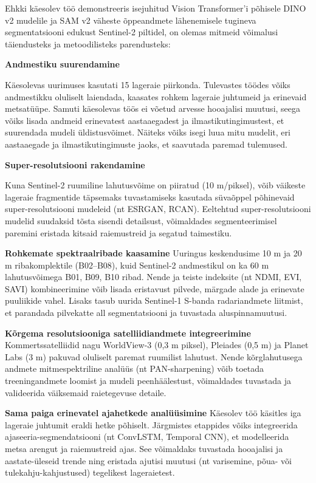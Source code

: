 Ehkki käesolev töö demonstreeris isejuhitud Vision Transformer'i põhisele DINO
v2 mudelile ja SAM v2 väheste õppeandmete lähenemisele tugineva segmentatsiooni
edukust Sentinel-2 piltidel, on olemas mitmeid võimalusi täiendusteks ja
metoodilisteks parendusteks:

\textbf{Andmestiku suurendamine}

Käesolevas uurimuses kasutati 15 lageraie piirkonda. Tulevastes töödes võiks
andmestikku oluliselt laiendada, kaasates rohkem lageraie juhtumeid ja
erinevaid metsatüüpe. Samuti käesolevas töös ei võetud arvesse hooajalisi
muutusi, seega võiks lisada andmeid erinevatest aastaaegadest ja ilmastikutingimustest,
et suurendada mudeli üldistusvõimet. Näiteks võiks isegi luua mitu mudelit, eri aastaaegade ja ilmastikutingimuste jaoks, et saavutada paremad tulemused.

\textbf{Super-resolutsiooni rakendamine} 

Kuna Sentinel-2 ruumiline lahutusvõime on
piiratud (10 m/piksel), võib väikeste lageraie fragmentide täpsemaks tuvastamiseks
kasutada süvaõppel põhinevaid super-resolutsiooni mudeleid (nt ESRGAN, RCAN).
Eeltehtud super-resolutsiooni mudelid suudaksid tõsta sisendi detailsust,
võimaldades segmenteerimisel paremini eristada kitsaid raiemustreid ja segatud
taimestiku.

\textbf{Rohkemate spektraalribade kaasamine} 
Uuringus keskendusime 10 m ja 20 m
riba­komplektile (B02--B08), kuid Sentinel-2 andmestikul on ka 60 m
lahutusvõimega B01, B09, B10 ribad. Nende ja teiste indeksite (nt NDMI, EVI,
SAVI) kombineerimine võib lisada eristavust pilvede, märgade alade ja erinevate
puuliikide vahel. Lisaks tasub uurida Sentinel-1 S-banda radariandmete liitmist,
et parandada pilvekatte all segmentatsiooni ja tuvastada aluspinnamuutusi.

\textbf{Kõrgema resolutsiooniga satelliidiandmete integreerimine}
 Kommertssatelliidid
nagu WorldView-3 (0,3 m piksel), Pleiades (0,5 m) ja Planet Labs (3 m) pakuvad
oluliselt paremat ruumilist lahutust. Nende kõrglahutusega andmete
mitmespektriline analüüs (nt PAN-sharpening) võib toetada treeningandmete
loomist ja mudeli peenhäälestust, võimaldades tuvastada ja valideerida
väiksemaid raietegevuse detaile.

\textbf{Sama paiga erinevatel ajahetkede analüüsimine} 
Käesolev töö käsitles iga lageraie juhtumit
eraldi hetke põhiselt. Järgmistes etappides võiks integreerida
ajaseeria-segmendatsiooni (nt ConvLSTM, Temporal CNN), et modelleerida metsa
arengut ja raiemustreid ajas. See võimaldaks tuvastada hooajalisi ja
aastate-üleseid trende ning eristada ajutisi muutusi (nt varisemine, põua- või
tulekahju-kahjustused) tegelikest lageraietest.

